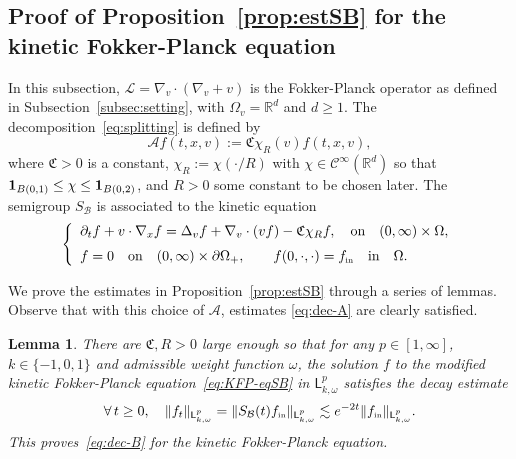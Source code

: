 \documentclass[11pt]{amsart}
\newtheorem{lemma}[theorem]{Lemma}
\theoremstyle{definition}
\theoremstyle{remark}
\numberwithin{equation}{section}
\newcommand\R{{\mathbb R}}
\def\BB{{\mathcal B}}
\newcommand{\init}{\text{{\tiny {\rm in}}}}
\newcommand{\sfL}{\mathsf{L}}
\begin{document}
\subsection{Proof of Proposition~\ref{prop:estSB} for the kinetic Fokker-Planck equation}
\label{subsec-split-FP}

In this subsection, $\mathcal{L}=\nabla_v \cdot ( \nabla_v + v )$ is the Fokker-Planck operator as defined in Subsection~\ref{subsec:setting}, with $\Omega_v=\R^d$ and $d \ge 1$. The decomposition~\eqref{eq:splitting} is defined by
\begin{equation}
  \label{eq:KFP-defA}
  \mathcal{A} f(t,x,v) := \mathfrak{C} \chi_R(v) f(t,x,v),
\end{equation}
where $\mathfrak{C}>0$ is a constant, $\chi_R := \chi(\cdot/R)$ with $\chi \in \mathcal{C}^\infty(\R^d)$ so that ${\bf 1}_{B(0,1)} \le \chi \le {\bf 1}_{B(0,2)}$, and $R>0$ some constant to be chosen later. The semigroup $S_\mathcal{B}$ is associated to the kinetic equation
\begin{equation}
  \label{eq:KFP-eqSB}
  \left\{
    \begin{array}{l}
      \partial_t f + v \cdot \nabla_x f = \Delta_v f + \nabla_v \cdot (v f) - \mathfrak{C} \chi_R f,  \quad \hbox{on}\quad (0,\infty) \times \Omega,   \\[2mm]
      f = 0 \quad \hbox{on}\quad (0,\infty) \times \partial\Omega_+, 
      \qquad f(0,\cdot,\cdot) = f_\init \quad \hbox{in}\quad \Omega.
    \end{array}
  \right.
\end{equation}

We prove the estimates in Proposition~\ref{prop:estSB} through a series of lemmas. Observe that with this choice of $\mathcal{A}$, estimates \eqref{eq:dec-A} are clearly satisfied.
\begin{lemma}
  \label{lem:estSBLpkKFP}
  There are $\mathfrak{C}, R>0$ large enough so that for any $p \in [1,\infty]$, $k \in \{ -1,0,1 \}$ and admissible weight function $\omega$, the solution $f$ to the modified kinetic Fokker-Planck equation~\eqref{eq:KFP-eqSB} in $\sfL^{p}_{k,\omega}$ satisfies the decay estimate
  \begin{equation}
    \label{eq:dec-B-KFP}
    \forall \, t \ge 0, \quad \| f_t \|_{\sfL^p_{k,\omega}} = \| S_\BB(t) f_\init \|_{\sfL^p_{k,\omega}}  \lesssim   e^{- 2t} \| f_\init\|_{\sfL^{p}_{k,\omega}}.
  \end{equation}
  This proves~\eqref{eq:dec-B} for the kinetic Fokker-Planck equation.
\end{lemma}
\end{document}
